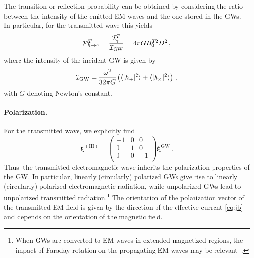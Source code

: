 \documentclass[a4paper,11pt]{article}
\begin{document}
The transition or reflection probability can be obtained by considering the ratio between the intensity of the emitted EM waves and the one stored in the GWs. In particular, for the transmitted wave this yields
%
\begin{align}
    \mathcal{P}_{h \rightarrow \gamma}^{T} =  \frac{\mathcal{I}_{\gamma}^{T}}{\mathcal{I}_{\rm GW}} = 4 \pi G B_{0}^{T 2}  D^{2} \, , 
    \label{eq:transition_prob}
\end{align}
%
where the intensity of the incident GW is given by
%
\begin{align}
   \mathcal{I}_{\rm GW}
   = \frac{\omega^{2}}{32 \pi G} \left( \langle \vert h_{+} \vert^{2} \rangle + \langle \vert h_{\times} \vert^{2} \rangle \right) \,,
\end{align}
with $G$ denoting Newton's constant. 



\paragraph{Polarization.}
%
For the transmitted wave, we explicitly find
%
\begin{equation}
    \bm{\xi}^{(\text{III})} = \left(
\begin{array}{ccc}
 -1 & 0 & 0 \\
 0 & 1 & 0 \\
 0 & 0 & -1 \\
\end{array}
\right) \bm{\xi}^{\text{GW}} \, .
\end{equation}
%
Thus, the transmitted electromagnetic wave inherits the polarization properties of the GW.
%
In particular, linearly (circularly) polarized GWs give rise to linearly (circularly) polarized electromagnetic radiation, while unpolarized GWs lead to unpolarized transmitted radiation.\footnote{When GWs are converted to EM waves in extended magnetized regions, the impact of Faraday rotation on the propagating EM waves may be relevant~\cite{Li:2025eoo}.}
%
The orientation of the polarization vector of the transmitted EM field is given by the direction of the effective current \eqref{eq:jb} and depends on the orientation of the magnetic field.
\end{document}
